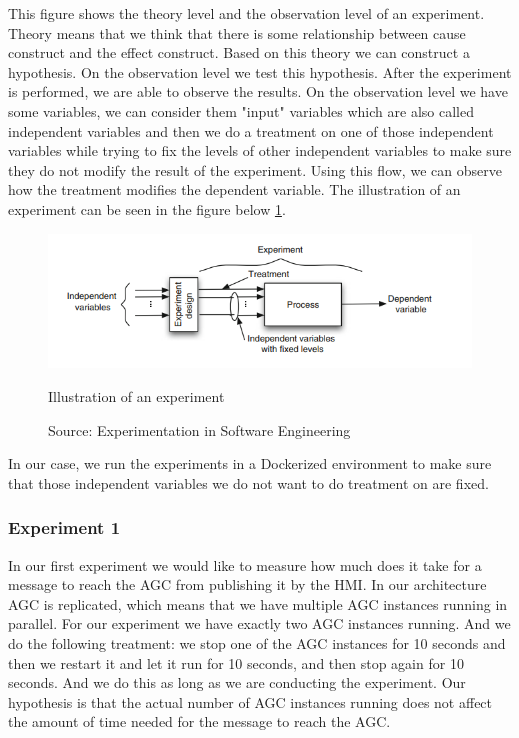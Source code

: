 This figure shows the theory level and the observation level of an experiment. Theory means that we think that there is some relationship between cause construct and the effect construct. Based on this theory we can construct a hypothesis. On the observation level we test this hypothesis. After the experiment is performed, we are able to observe the results. On the observation level we have some variables, we can consider them "input" variables which are also called independent variables and then we do a treatment on one of those independent variables while trying to fix the levels of other independent variables to make sure they do not modify the result of the experiment. Using this flow, we can observe how the treatment modifies the dependent variable. The illustration of an experiment can be seen in the figure below \ref{fig:experiment_illustration}.

\begin{figure}[h]
\centering
  \includegraphics[width=\linewidth]{images/experiment_illustration.png}
  \caption{Illustration of an experiment}
  \caption*{Source: Experimentation in Software Engineering}
  \cite{experimentationInSoftwareEngineering}
  \label{fig:experiment_illustration}
\end{figure}

In our case, we run the experiments in a Dockerized environment to make sure that those independent variables we do not want to do treatment on are fixed.

\subsubsection{Experiment 1}
\label{sec:experiment_1}
In our first experiment we would like to measure how much does it take for a message to reach the AGC from publishing it by the HMI. In our architecture AGC is replicated, which means that we have multiple AGC instances running in parallel. For our experiment we have exactly two AGC instances running. And we do the following treatment: we stop one of the AGC instances for 10 seconds and then we restart it and let it run for 10 seconds, and then stop again for 10 seconds. And we do this as long as we are conducting the experiment. Our hypothesis is that the actual number of AGC instances running does not affect the amount of time needed for the message to reach the AGC.

